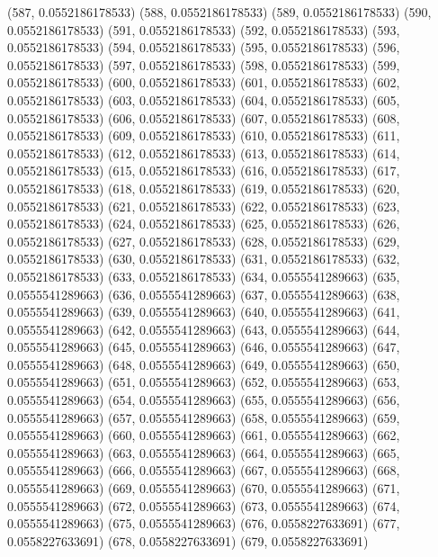 {					(587, 0.0552186178533)
					(588, 0.0552186178533)
					(589, 0.0552186178533)
					(590, 0.0552186178533)
					(591, 0.0552186178533)
					(592, 0.0552186178533)
					(593, 0.0552186178533)
					(594, 0.0552186178533)
					(595, 0.0552186178533)
					(596, 0.0552186178533)
					(597, 0.0552186178533)
					(598, 0.0552186178533)
					(599, 0.0552186178533)
					(600, 0.0552186178533)
					(601, 0.0552186178533)
					(602, 0.0552186178533)
					(603, 0.0552186178533)
					(604, 0.0552186178533)
					(605, 0.0552186178533)
					(606, 0.0552186178533)
					(607, 0.0552186178533)
					(608, 0.0552186178533)
					(609, 0.0552186178533)
					(610, 0.0552186178533)
					(611, 0.0552186178533)
					(612, 0.0552186178533)
					(613, 0.0552186178533)
					(614, 0.0552186178533)
					(615, 0.0552186178533)
					(616, 0.0552186178533)
					(617, 0.0552186178533)
					(618, 0.0552186178533)
					(619, 0.0552186178533)
					(620, 0.0552186178533)
					(621, 0.0552186178533)
					(622, 0.0552186178533)
					(623, 0.0552186178533)
					(624, 0.0552186178533)
					(625, 0.0552186178533)
					(626, 0.0552186178533)
					(627, 0.0552186178533)
					(628, 0.0552186178533)
					(629, 0.0552186178533)
					(630, 0.0552186178533)
					(631, 0.0552186178533)
					(632, 0.0552186178533)
					(633, 0.0552186178533)
					(634, 0.0555541289663)
					(635, 0.0555541289663)
					(636, 0.0555541289663)
					(637, 0.0555541289663)
					(638, 0.0555541289663)
					(639, 0.0555541289663)
					(640, 0.0555541289663)
					(641, 0.0555541289663)
					(642, 0.0555541289663)
					(643, 0.0555541289663)
					(644, 0.0555541289663)
					(645, 0.0555541289663)
					(646, 0.0555541289663)
					(647, 0.0555541289663)
					(648, 0.0555541289663)
					(649, 0.0555541289663)
					(650, 0.0555541289663)
					(651, 0.0555541289663)
					(652, 0.0555541289663)
					(653, 0.0555541289663)
					(654, 0.0555541289663)
					(655, 0.0555541289663)
					(656, 0.0555541289663)
					(657, 0.0555541289663)
					(658, 0.0555541289663)
					(659, 0.0555541289663)
					(660, 0.0555541289663)
					(661, 0.0555541289663)
					(662, 0.0555541289663)
					(663, 0.0555541289663)
					(664, 0.0555541289663)
					(665, 0.0555541289663)
					(666, 0.0555541289663)
					(667, 0.0555541289663)
					(668, 0.0555541289663)
					(669, 0.0555541289663)
					(670, 0.0555541289663)
					(671, 0.0555541289663)
					(672, 0.0555541289663)
					(673, 0.0555541289663)
					(674, 0.0555541289663)
					(675, 0.0555541289663)
					(676, 0.0558227633691)
					(677, 0.0558227633691)
					(678, 0.0558227633691)
					(679, 0.0558227633691)
}

